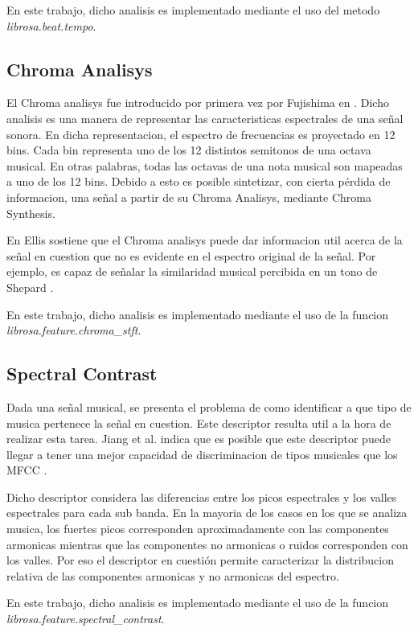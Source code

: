 \documentclass[]{article}
\begin{document}
\begin{multicols}{2}
\cite{alonso2004tempo}
En este trabajo, dicho analisis es implementado mediante el uso del metodo \emph{{librosa.beat.tempo}}.
\subsection{Chroma Analisys}
\label{Sec:Chroma}
El Chroma analisys fue introducido por primera vez por Fujishima en \cite{fujishima1999realtime}.
Dicho analisis es una manera de representar las caracteristicas espectrales
de una señal sonora. En dicha representacion, el espectro de frecuencias es
proyectado en 12 bins. Cada bin representa uno de los 12 distintos semitonos
de una octava musical. En otras palabras, todas las octavas de una nota musical
son mapeadas a uno de los 12 bins. Debido a esto es posible sintetizar, con cierta
pérdida de informacion, una señal a partir de su Chroma Analisys, mediante Chroma
Synthesis.

En \cite{Ellis} Ellis sostiene que el Chroma analisys puede dar informacion
util acerca de la señal en cuestion que no es evidente en el espectro original de
la señal. Por ejemplo, es capaz de señalar la similaridad musical percibida en
un tono de Shepard \cite{bello}.

En este trabajo, dicho analisis es implementado mediante el uso de la funcion \emph{{librosa.feature.chroma\_stft}}.
\subsection{Spectral Contrast}
Dada una señal musical, se presenta el problema de como identificar a que tipo de
musica pertenece la señal en cuestion. Este descriptor resulta util a la hora de
realizar esta tarea. Jiang et al. indica que es posible que este descriptor puede llegar
a tener una mejor capacidad de discriminacion de tipos musicales que los MFCC
\cite{DanNingJiang}.

Dicho descriptor considera las diferencias entre los picos espectrales y los valles
espectrales para cada sub banda. En la mayoria de los casos en los que se analiza
musica, los fuertes picos corresponden aproximadamente con las componentes armonicas
mientras que las componentes no armonicas o ruidos corresponden con los valles.
Por eso el descriptor en cuestión permite caracterizar la distribucion relativa
de las componentes armonicas y no armonicas del espectro.

En este trabajo, dicho analisis es implementado mediante el uso de la funcion \emph{{librosa.feature.spectral\_contrast}}.

\end{multicols}
\end{document}
